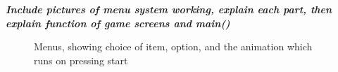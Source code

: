 \documentclass[a4paper,12pt]{article}
\begin{document}
\begin{flushleft}
\textbf{\textit{Include pictures of menu system working, explain each part, then explain function of game screens and main()}}

\begin{figure}[H]
	\centering	{}
	\caption{Menus, showing choice of item, option, and the animation which runs on pressing start}
\end{figure}


\end{flushleft}



\newpage
\end{document}
